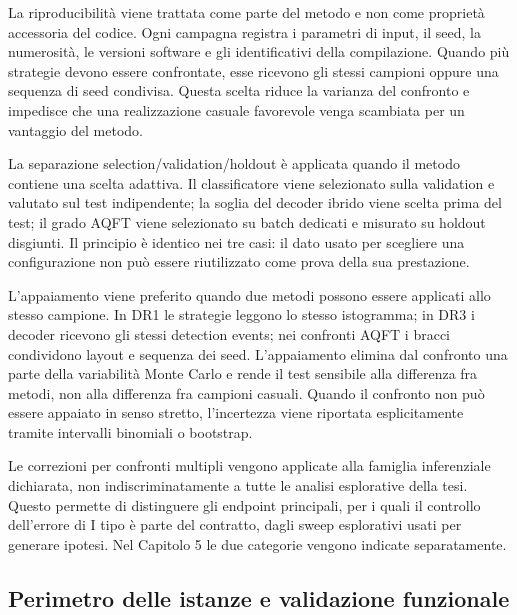 La riproducibilità viene trattata come parte del metodo e non come proprietà accessoria del codice. Ogni campagna registra i parametri di input, il seed, la numerosità, le versioni software e gli identificativi della compilazione. Quando più strategie devono essere confrontate, esse ricevono gli stessi campioni oppure una sequenza di seed condivisa. Questa scelta riduce la varianza del confronto e impedisce che una realizzazione casuale favorevole venga scambiata per un vantaggio del metodo.

La separazione selection/validation/holdout è applicata quando il metodo contiene una scelta adattiva. Il classificatore viene selezionato sulla validation e valutato sul test indipendente; la soglia del decoder ibrido viene scelta prima del test; il grado AQFT viene selezionato su batch dedicati e misurato su holdout disgiunti. Il principio è identico nei tre casi: il dato usato per scegliere una configurazione non può essere riutilizzato come prova della sua prestazione.

L'appaiamento viene preferito quando due metodi possono essere applicati allo stesso campione. In DR1 le strategie leggono lo stesso istogramma; in DR3 i decoder ricevono gli stessi detection events; nei confronti AQFT i bracci condividono layout e sequenza dei seed. L'appaiamento elimina dal confronto una parte della variabilità Monte Carlo e rende il test sensibile alla differenza fra metodi, non alla differenza fra campioni casuali. Quando il confronto non può essere appaiato in senso stretto, l'incertezza viene riportata esplicitamente tramite intervalli binomiali o bootstrap.

Le correzioni per confronti multipli vengono applicate alla famiglia inferenziale dichiarata, non indiscriminatamente a tutte le analisi esplorative della tesi. Questo permette di distinguere gli endpoint principali, per i quali il controllo dell'errore di I tipo è parte del contratto, dagli sweep esplorativi usati per generare ipotesi. Nel Capitolo 5 le due categorie vengono indicate separatamente.

\subsection{Perimetro delle istanze e validazione funzionale}\label{sec:finale_3_5_1}

